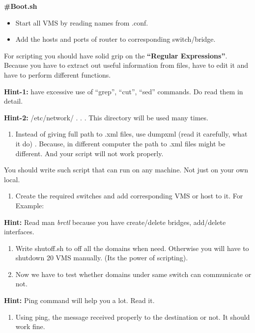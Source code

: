 \documentclass[letterpaper,10pt,english]{sphinxmanual}
\begin{document}
\textbf{\#Boot.sh}
\begin{itemize}
\item {} 
Start all VMS by reading names from .conf.

\item {} 
Add the hosts and ports of router to corresponding switch/bridge.

\end{itemize}

For scripting you should have solid grip on the \textbf{“Regular Expressions”}. Because you have to extract out useful information from files, have to edit it and have to perform different functions.

\textbf{Hint-1:} have excessive use of “grep”, “cut”, “sed” commands. Do read them in detail.

\textbf{Hint-2:} /etc/network/ . . . This directory will be used many times.
\begin{enumerate}
\item {} 
Instead of giving full path to .xml files, use dumpxml (read it carefully, what it do) . Because, in different computer the path to .xml files might be different. And your script will not work properly.

\end{enumerate}

You should write such script that can run on any machine. Not just on your own local.
\begin{enumerate}
\item {} 
Create the required switches and add corresponding VMS or host to it. For Example:

\end{enumerate}


\textbf{Hint:} Read man \emph{brctl} because you have create/delete bridges, add/delete interfaces.
\begin{enumerate}
\item {} 
Write shutoff.sh to off all the domains when need. Otherwise you will have to shutdown 20 VMS manually. (Its the power of scripting).

\item {} 
Now we have to test whether domains under same switch can communicate or not.

\end{enumerate}

\textbf{Hint:}  Ping command will help you a lot. Read it.
\begin{enumerate}
\item {} 
Using ping, the message received properly to the destination or not. It should work fine.

\end{enumerate}
\end{document}
